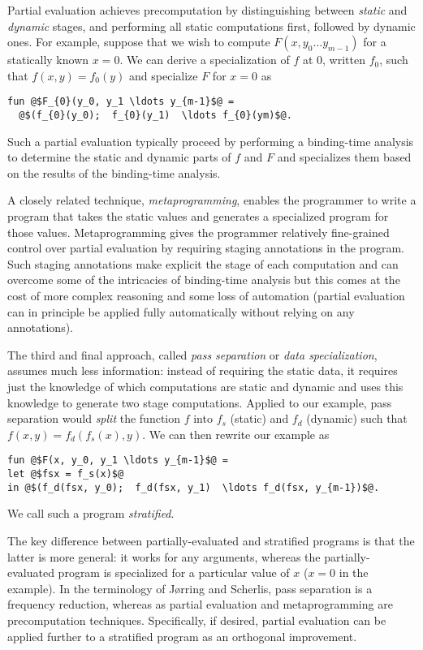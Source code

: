 Partial evaluation achieves precomputation by distinguishing between 
{\em static} and {\em dynamic} stages, and performing all static
computations first, followed by dynamic ones.  For example,
suppose that we wish to compute $F(x, y_0 \ldots y_{m-1})$ for a
statically known $x = 0$.  We can derive a specialization of $f$ at
$0$, written $f_0$, such that $f(x,y) = f_{0}(y)$ and specialize $F$
for $x=0$ as
\begin{lstlisting}
fun @$F_{0}(y_0, y_1 \ldots y_{m-1}$@ = 
  @$(f_{0}(y_0);  f_{0}(y_1)  \ldots f_{0}(ym)$@.
\end{lstlisting}
%
Such a partial evaluation typically proceed by performing a
binding-time analysis to determine the static and dynamic parts of $f$
and $F$ and specializes them based on the results of the binding-time
analysis.

A closely related technique, {\em metaprogramming}, enables the
programmer to write a program that takes the static values and
generates a specialized program for those values.  Metaprogramming
gives the programmer relatively fine-grained control over partial
evaluation by requiring staging annotations in the program.  Such
staging annotations make explicit the stage of each computation and
can overcome some of the intricacies of binding-time analysis but this
comes at the cost of more complex reasoning and some loss of
automation (partial evaluation can in principle be applied fully
automatically without relying on any annotations).

The third and final approach, called {\em pass separation} or {\em
  data specialization}, assumes much less information: instead of
requiring the static data, it requires just the knowledge of which
computations are static and dynamic and uses this knowledge to
generate two stage computations. 
%
Applied to our example, pass separation would {\em split} the function
$f$ into $f_s$ (static) and $f_d$ (dynamic) such that $f(x,y) =
f_d(f_s(x),y)$.  We can then rewrite our example as
%
\begin{lstlisting}
fun @$F(x, y_0, y_1 \ldots y_{m-1}$@ = 
let @$fsx = f_s(x)$@
in @$(f_d(fsx, y_0);  f_d(fsx, y_1)  \ldots f_d(fsx, y_{m-1})$@.
\end{lstlisting}
We call such a program {\em stratified}.

The key difference between partially-evaluated and stratified
programs is that the latter is more general: it works for any
arguments, whereas the partially-evaluated program is specialized for
a particular value of $x$ ($x = 0$ in the example).  
In the terminology of J{\o}rring and Scherlis, pass separation
is a frequency reduction, whereas as partial evaluation and
metaprogramming are precomputation techniques.  Specifically, if
desired, partial evaluation can be applied further to a stratified
program as an orthogonal improvement.

